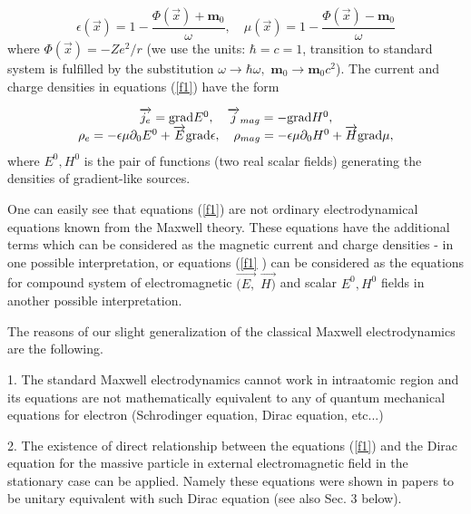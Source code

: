 \documentclass[a4paper,12pt]{article}
\begin{document}
\begin{equation}
\epsilon \left( \overrightarrow{x}\right) =1-\frac{\Phi \left(
\overrightarrow{x}\right) +\mathbf{m}_0}\omega ,\quad \mu \left(
\overrightarrow{x}\right) =1-\frac{\Phi \left( \overrightarrow{x}\right) -%
\mathbf{m}_0}\omega  \label{f2}
\end{equation}
where $\Phi \left( \overrightarrow{x}\right) =-Ze^2/r$ (we use the units: $%
\hbar =c=1$, transition to standard system is fulfilled by the substitution $%
\omega \longrightarrow \hbar \omega ,$ $\mathbf{m}_0\longrightarrow \mathbf{m%
}_0c^2$). The current and charge densities in equations (\ref{f1}) have the
form

\begin{equation}
\begin{array}{c}
\overrightarrow{j_e}=\mathrm{grad}E^0,\quad \overrightarrow{j}_{mag}=-%
\mathrm{grad}H^0, \\
\rho _e=-\epsilon \mu \partial _0E^0+\overrightarrow{E}\mathrm{grad}\epsilon
,\quad \rho _{mag}=-\epsilon \mu \partial _0H^0+\overrightarrow{H}\mathrm{%
grad}\mu ,
\end{array}
\label{f3}
\end{equation}
where $E^0,H^0$ is the pair of functions (two real scalar fields) generating
the densities of gradient-like sources.

One can easily see that equations (\ref{f1}) are not ordinary
electrodynamical equations known from the Maxwell theory. These equations
have the additional terms which can be considered as the magnetic current
and charge densities - in one possible interpretation, or equations (\ref{f1}%
) can be considered as the equations for compound system of electromagnetic $%
\overrightarrow{(E,}$ $\overrightarrow{H)}$ and scalar $E^0,H^0$ fields in
another possible interpretation.

The reasons of our slight generalization of the classical Maxwell
electrodynamics are the following.

1. The standard Maxwell electrodynamics cannot work in intraatomic region
and its equations are not mathematically equivalent to any of quantum
mechanical equations for electron (Schrodinger equation, Dirac equation,
etc...)

2. The existence of direct relationship between the equations (\ref{f1}) and
the Dirac equation for the massive particle in external electromagnetic
field in the stationary case can be applied. Namely these equations were
shown in papers \cite{S1} to be unitary equivalent with such Dirac equation
(see also Sec. 3 below).
\end{document}
